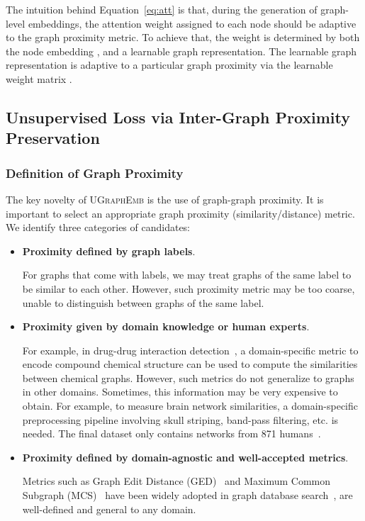 \documentclass{article}
\newcommand{\model}{\textsc{UGraphEmb}\xspace}
\begin{document}
The intuition behind Equation~\ref{eq:att} is that, during the generation of graph-level embeddings, the attention weight assigned to each node should be adaptive to the graph proximity metric. To achieve that, the weight is determined by both the node embedding , and a learnable graph representation.
The learnable graph representation is adaptive to a particular graph proximity via the learnable weight matrix . 




\subsection{Unsupervised Loss via Inter-Graph Proximity Preservation}


\subsubsection{Definition of Graph Proximity}
The key novelty of \model is the use of graph-graph proximity. It is important to select an appropriate graph proximity (similarity/distance) metric. We identify three categories of candidates:
\begin{itemize}
    \item \textbf{{Proximity defined by graph labels}}.
    
    For graphs that come with labels, we may treat graphs of the same label to be similar to each other. 
    However, such proximity metric may be too coarse, unable to distinguish between graphs of the same label. 


    \item \textbf{{Proximity given by domain knowledge or human experts}}.
    
    For example, in drug-drug interaction detection~\cite{ma2018drug}, a domain-specific metric to encode compound chemical structure can be used to compute the similarities between chemical graphs. 
    However, such metrics do not generalize to graphs in other domains. Sometimes, this information may be very expensive to obtain. For example, to measure brain network similarities, a domain-specific preprocessing pipeline involving skull striping, band-pass filtering, etc. is needed. The final dataset only contains networks from 871 humans~\cite{ktena2017distance}.

    \item \textbf{{Proximity defined by domain-agnostic and well-accepted metrics}}.
    
    Metrics such as Graph Edit Distance (GED)~\cite{bunke1983distance} and Maximum Common Subgraph (MCS)~\cite{bunke1998graph} have been widely adopted in graph database search~\cite{yan2005substructure,liang2017similarity}, are well-defined and general to any domain. 
\end{itemize}
\end{document}
